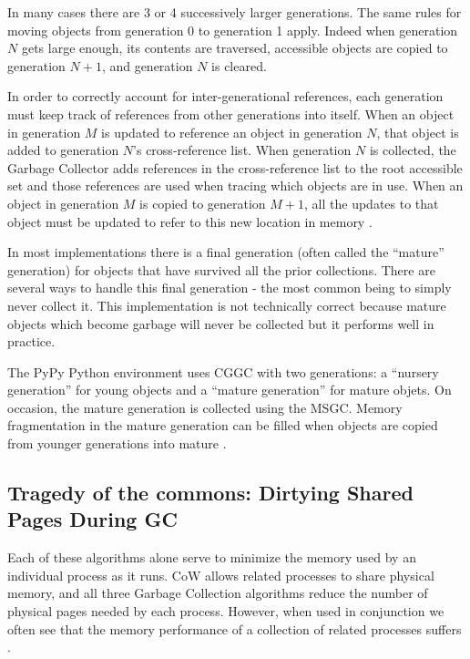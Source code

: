 \documentclass{article}
\begin{document}
\begin{sloppypar}
In many cases there are 3 or 4 successively larger generations.  The same rules for moving objects from generation 0 to generation 1 apply.  Indeed when generation $N$ gets large enough, its contents are traversed, accessible objects are copied to generation $N+1$, and generation $N$ is cleared.

In order to correctly account for inter-generational references, each generation must keep track of references from other generations into itself.  When an object in generation $M$ is updated to reference an object in generation $N$, that object is added to generation $N$'s cross-reference list.  When generation $N$ is collected, the Garbage Collector adds references in the cross-reference list to the root accessible set and those references are used when tracing which objects are in use.  When an object in generation $M$ is copied to generation $M + 1$, all the updates to that object must be updated to refer to this new location in memory \cite{GC-continuum}.  

In most implementations there is a final generation (often called the ``mature'' generation) for objects that have survived all the prior collections.  There are several ways to handle this final generation - the most common being to simply never collect it.  This implementation is not technically correct because mature objects which become garbage will never be collected but it performs well in practice.  

The PyPy Python environment uses CGGC with two generations: a ``nursery generation'' for young objects and a ``mature generation'' for mature objets.  On occasion, the mature generation is collected using the MSGC.  Memory fragmentation in the mature generation can be filled when objects are copied from younger generations into mature \cite{pypy-doc}.  

\subsection{Tragedy of the commons: Dirtying Shared Pages During GC}\label{sec:CoWGC}

Each of these algorithms alone serve to minimize the memory used by an individual process as it runs.  CoW allows related processes to share physical memory, and all three Garbage Collection algorithms reduce the number of physical pages needed by each process.  However, when used in conjunction we often see that the memory performance of a collection of related processes suffers \cite{dismissing_garbage}.


\end{sloppypar}
\end{document}
